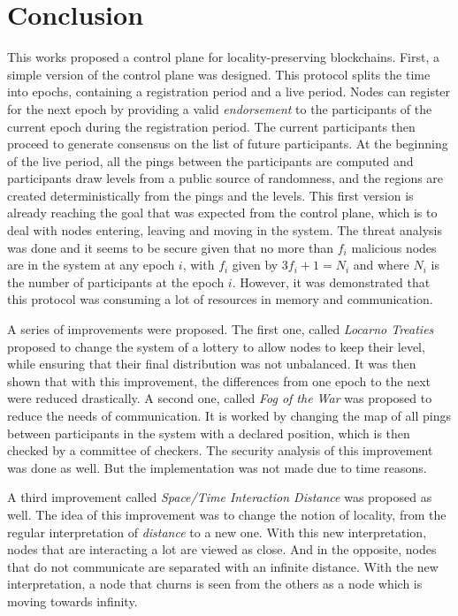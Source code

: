 \documentclass[a4paper,11pt,oneside]{report}
\begin{document}
\chapter{Conclusion} \label{chap:Conclusion} %


This works proposed a control plane for locality-preserving blockchains. First, a simple
version of the control plane was designed. This protocol splits the time into
epochs, containing a registration period and a live period. Nodes can register
for the next epoch by providing a valid \textit{endorsement} to the participants of the
current epoch during the registration period. The current participants then
proceed to generate consensus on the list of future participants. At the
beginning of the live period, all the pings between the participants are
computed and participants draw levels from a public source of randomness, and
the regions are created deterministically from the pings and the levels. This
first version is already reaching the goal that was expected from the control
plane, which is to deal with nodes entering, leaving and moving in the system.
The threat analysis was done and it seems to be secure given that no more than
$f_i$ malicious nodes are in the system at any epoch $i$, with $f_i$ given by
$3f_i+1=N_i$ and where $N_i$ is the number of participants at the epoch $i$.
However, it was demonstrated that this protocol was consuming a lot of resources
in memory and communication. 

A series of improvements were proposed. The first one, called \textit{Locarno
Treaties} proposed to change the system of a lottery to allow nodes to keep
their level, while ensuring that their final distribution was not unbalanced.
It was then shown that with this improvement, the differences from one epoch to
the next were reduced drastically. A second one, called \textit{Fog of the
War} was proposed to reduce the needs of communication. It is worked by
changing the map of all pings between participants in the system with a
declared position, which is then checked by a committee of checkers. The
security analysis of this improvement was done as well. But the implementation
was not made due to time reasons. 

A third improvement called \textit{Space/Time Interaction Distance} was proposed
as well. The idea of this improvement was to change the notion of locality,
from the regular interpretation of \textit{distance} to a new one. With this
new interpretation, nodes that are interacting a lot are viewed as close. And
in the opposite, nodes that do not communicate are separated with an infinite
distance. With the new interpretation, a node that churns is seen from the
others as a node which is moving towards infinity.  
\end{document}
